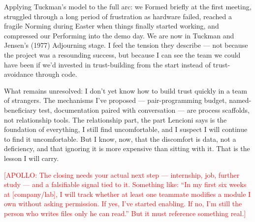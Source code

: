 Applying Tuckman's model to the full arc: we Formed briefly at the first meeting, struggled through a long period of frustration as hardware failed, reached a fragile Norming during Easter when things finally started working, and compressed our Performing into the demo day. We are now in Tuckman and Jensen's (1977) Adjourning stage. I feel the tension they describe --- not because the project was a resounding success, but because I can see the team we could have been if we'd invested in trust-building from the start instead of trust-avoidance through code.

What remains unresolved: I don't yet know how to build trust quickly in a team of strangers. The mechanisms I've proposed --- pair-programming budget, named-beneficiary test, documentation paired with conversation --- are process scaffolds, not relationship tools. The relationship part, the part Lencioni says is the foundation of everything, I still find uncomfortable, and I suspect I will continue to find it uncomfortable. But I know, now, that the discomfort is data, not a deficiency, and that ignoring it is more expensive than sitting with it. That is the lesson I will carry.

\textcolor{red}{[APOLLO: The closing needs your actual next step --- internship, job, further study --- and a falsifiable signal tied to it. Something like: ``In my first six weeks at [company/lab], I will track whether at least one teammate modifies a module I own without asking permission. If yes, I've started enabling. If no, I'm still the person who writes files only he can read.'' But it must reference something real.]}
